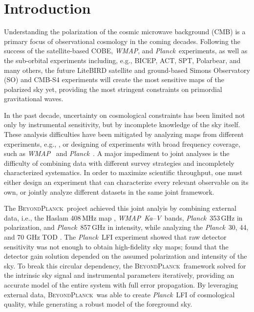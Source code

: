\documentclass[twocolumn]{../../common/aa}
\def\WMAP{\emph{WMAP}}
\def\Planck{\emph{Planck}}
\newcommand{\bp}{\textsc{BeyondPlanck}}
\newcommand{\Ka}[0]{\textit{Ka}}
\newcommand{\V}[0]{\textit V}
\begin{document}
\maketitle

\tableofcontents




\section{Introduction}
\label{sec:introduction}

Understanding the polarization of the cosmic microwave background (CMB) is a primary focus of observational cosmology in the coming decades. Following the success of the satellite-based COBE, \WMAP, and \Planck\ experiments, as well as the sub-orbital experiments including, e.g., BICEP, ACT, SPT, Polarbear, and many others, the future LiteBIRD satellite and ground-based Simons Observatory (SO) and CMB-S4 experiments will create the most sensitive maps of the polarized sky yet, providing the most stringent constraints on primordial gravitational waves.

In the past decade, uncertainty on cosmological constraints has been limited not only by instrumental sensitivity, but by incomplete knowledge of the sky itself. These analysis difficulties have been mitigated by analyzing maps from different experiments, e.g., \citet{pb2015}, or designing of experiments with broad frequency coverage, such as \WMAP\ \citep{bennett2012} and \Planck\ \citet{pb2015}. A major impediment to joint analyses is the difficulty of combining data with different survey strategies and incompletely characterized systematics. In order to maximize scientific throughput, one must either design an experiment that can characterize every relevant observable on its own, or jointly analyze different datasets in the same joint framework.

The \bp\ project achieved this joint analyis by combining external data, i.e., the Haslam 408\,MHz map \citep{haslam1982}, \WMAP\ \Ka--\V\ bands, \Planck\ 353\,GHz in polarization, and \Planck\ 857\,GHz in intensity, while analyzing the \Planck\ 30, 44, and 70 GHz TOD \citep{bp01}.
The \Planck\ LFI experiment showed that raw detector sensitivity was not enough to obtain high-fidelity sky maps; \citet{planck2016-l02} found that the detector gain solution depended on the assumed polarization and intensity of the sky. To break this circular dependency, the \bp\ framework solved for the intrinsic sky signal and instrumental parameters iteratively, providing an accurate model of the entire system with full error propagation. By leveraging external data, \bp\ was able to create \Planck\ LFI of cosmological quality, while generating a robust model of the foreground sky.
\end{document}
